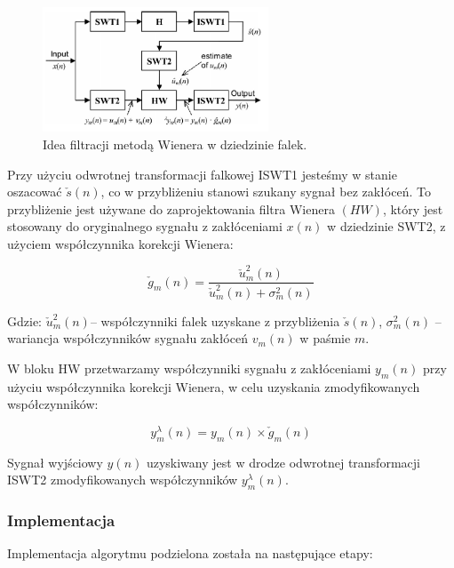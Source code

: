 \documentclass[a4paper]{article}
\begin{document}
\begin{figure}[H]
\centering
\includegraphics[width=0.6\textwidth]{wwf/WWF_diagram}
\caption{\label{wwf/WWF_diagram} Idea filtracji metodą Wienera w dziedzinie falek.}
\end{figure}

Przy użyciu odwrotnej transformacji falkowej ISWT1 jesteśmy w stanie oszacować $\check{s}(n)$, co w przybliżeniu stanowi szukany sygnał bez zakłóceń. To przybliżenie jest używane do zaprojektowania filtra Wienera $(HW)$, który jest stosowany do oryginalnego sygnału z zakłóceniami $x(n)$ w dziedzinie SWT2, z użyciem współczynnika korekcji Wienera:


\begin{equation} 
\check{g}_m(n)=\frac{\check{u}^2_m(n)}{\check{u}^2_m(n)+\sigma^2_m(n)}
\end{equation}

Gdzie:
$\check{u}^2_m(n)$– współczynniki falek uzyskane z przybliżenia $\check{s}(n)$,
$\sigma^2_m(n)$ – wariancja współczynników sygnału zakłóceń $v_m (n)$ w paśmie $m$.

W bloku HW przetwarzamy współczynniki sygnału z zakłóceniami $y_m (n)$ przy użyciu współczynnika korekcji Wienera, w celu uzyskania zmodyfikowanych współczynników:

\begin{equation} 
y^\lambda_m (n)=y_m (n) \times \check{g}_m(n)
\end{equation}

Sygnał wyjściowy $y(n)$ uzyskiwany jest w drodze odwrotnej transformacji ISWT2 zmodyfikowanych współczynników $y^\lambda_m (n)$.

\subsubsection{Implementacja}

Implementacja algorytmu podzielona została na następujące etapy:
	
\end{document}
